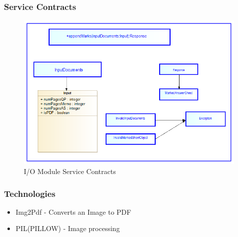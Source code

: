 \documentclass{article}
\begin{document}
		\subsubsection{Service Contracts}
					\begin{figure}[h]
				\includegraphics[scale=0.6]{Images/IO_Module/IOModuleServiceContracts}
				\caption{I/O Module Service Contracts}
			\end{figure}
			
		\subsubsection{Technologies}
					\begin{itemize}
				\item Img2Pdf - Converts an Image to PDF
				\item PIL(PILLOW) - Image processing
			\end{itemize}
		
\end{document}
